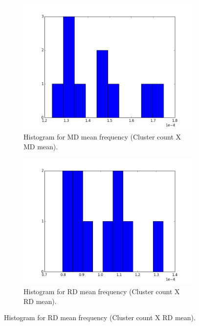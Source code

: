 \documentclass[a4paper,11pt]{report}
\begin{document}
\begin{figure}[!ht]
\begin{subfigure}[t]{.49\textwidth}
        \label{subfig:fa_hist_fa}
      \end{subfigure}\hfill\\
      \begin{subfigure}[t]{.49\textwidth}
        \includegraphics[width=1\linewidth]{img/histograms/fa_clustered_fa_mask_md_means_hist.png}
        \caption{Histogram for MD mean frequency (Cluster count X MD mean).}
        \label{subfig:fa_hist_md}
      \end{subfigure}\hfill%
      \begin{subfigure}[t]{.49\textwidth}
        \includegraphics[width=1\linewidth]{img/histograms/fa_clustered_fa_mask_rd_means_hist.png}
        \caption{Histogram for RD mean frequency (Cluster count X RD mean).}

\end{subfigure}
\end{figure}
\end{document}
